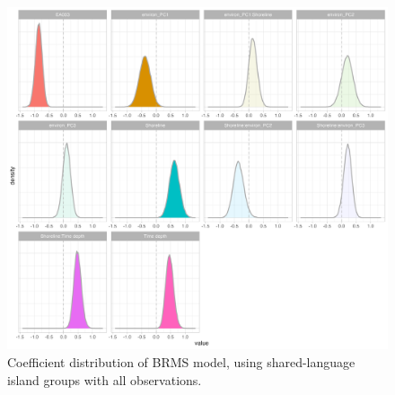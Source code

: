 \documentclass[unnumsec,webpdf,modern,medium]{oup-authoring-template}
\begin{document}
\begin{appendices}
\begin{figure}[ht]
\includegraphics[width=\textwidth]{brms_medium_group_full_effect_ridge_panels_plot.png}
\caption{Coefficient distribution of BRMS model, using shared-language island groups with all observations.}
\label{brms_medium_group_full_effect_ridge_panels}
\end{figure}


\end{appendices}
\end{document}
